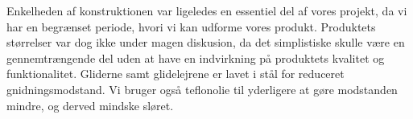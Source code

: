 Enkelheden af konstruktionen var ligeledes en essentiel del af vores
projekt, da vi har en begrænset periode, hvori vi kan udforme vores
produkt. Produktets størrelser var dog ikke under magen diskusion, da
det simplistiske skulle være en gennemtrængende del uden at have en
indvirkning på produktets kvalitet og funktionalitet. Gliderne samt glidelejrene er
lavet i stål for reduceret gnidningsmodstand. Vi bruger også teflonolie til
yderligere at gøre modstanden mindre, og derved mindske sløret.

 

